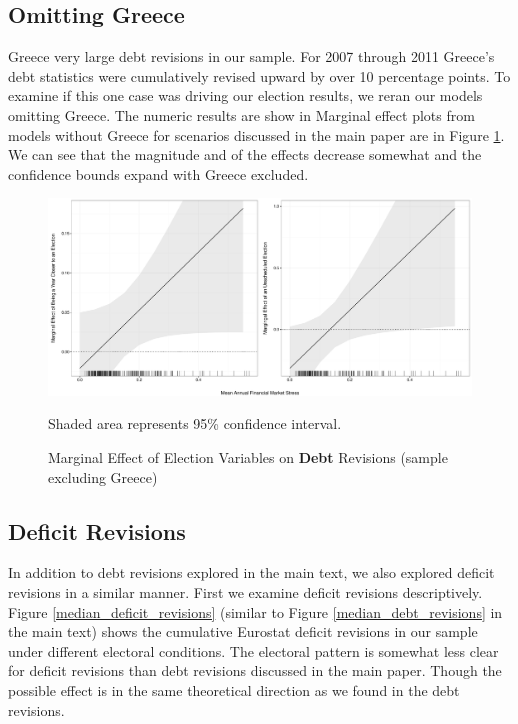 \documentclass[]{article}
\begin{document}
\subsection*{Omitting Greece}

Greece very large debt revisions in our sample. For 2007 through 2011 Greece's debt statistics were cumulatively revised upward by over 10 percentage points. To examine if this one case was driving our election results, we reran our models omitting Greece. The numeric results are show in Marginal effect plots from models without Greece for scenarios discussed in the main paper are in Figure \ref{me_no_greece}. We can see that the magnitude and of the effects decrease somewhat and the confidence bounds expand with Greece excluded.

\begin{figure}[H]
    \caption{Marginal Effect of Election Variables on \textbf{Debt} Revisions (sample excluding Greece)}
    \label{me_no_greece}

    \begin{center}
        \includegraphics[scale=0.4]{figures/debt_me_nogreece.pdf}
    \end{center}

	{\scriptsize{Shaded area represents 95\% confidence interval.}}

\end{figure}

\subsection*{Deficit Revisions}

In addition to debt revisions explored in the main text, we also explored deficit revisions in a similar manner. First we examine deficit revisions descriptively. Figure \ref{median_deficit_revisions} (similar to Figure \ref{median_debt_revisions} in the main text) shows the cumulative Eurostat deficit revisions in our sample under different electoral conditions. The electoral pattern is somewhat less clear for deficit revisions than debt revisions discussed in the main paper. Though the possible effect is in the same theoretical direction as we found in the debt revisions.
\end{document}
